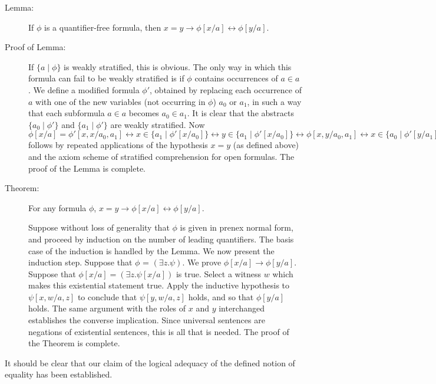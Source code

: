 \documentclass{article}
\begin{document}
\begin{description}

\item[Lemma:]  If $\phi$ is a quantifier-free formula, then 
$x = y \rightarrow \phi[x/a] \leftrightarrow \phi[y/a]$.

\item[Proof of Lemma:]  
If $\{a \mid \phi\}$ is weakly stratified, this is obvious.  The only
way in which this formula can fail to be weakly stratified is if
$\phi$ contains occurrences of $a \in a$.  We define a modified
formula $\phi'$, obtained by replacing each occurrence of $a$ with one
of the new variables (not occurring in $\phi$) $a_0$ or $a_1$, in such
a way that each subformula $a \in a$ becomes $a_0 \in a_1$.  It is
clear that the abstracts $\{a_0 \mid \phi'\}$ and $\{a_1 \mid \phi'\}$
are weakly stratified.  Now $\phi[x/a] = \phi'[x,x/a_0,a_1]
\leftrightarrow x \in \{a_1 \mid \phi'[x/a_0]\} \leftrightarrow y \in \{a_1 \mid \phi'[x/a_0]\} \leftrightarrow \phi[x,y/a_0,a_1] \leftrightarrow x \in \{a_0 \mid \phi'[y/a_1]\} \leftrightarrow y \in \{a_0 \mid \phi'[y/a_1]\} \leftrightarrow \phi'[y,y/a_0,a_1] = \phi[y/a]$ follows by repeated applications of the hypothesis $x = y$ (as defined above) and the axiom scheme of stratified comprehension for open formulas.  The proof of the Lemma is complete.

\item[Theorem:]  For any formula $\phi$, $x = y \rightarrow \phi[x/a] \leftrightarrow \phi[y/a]$.

Suppose without loss of generality that $\phi$ is given in prenex
normal form, and proceed by induction on the number of leading
quantifiers.  The basis case of the induction is handled by the Lemma.
We now present the induction step.  Suppose that $\phi$ = $(\exists
z.\psi)$.  We prove $\phi[x/a] \rightarrow \phi[y/a]$.  Suppose that
$\phi[x/a] = (\exists z.\psi[x/a])$ is true.  Select a witness $w$
which makes this existential statement true.  Apply the inductive
hypothesis to $\psi[x,w/a,z]$ to conclude that $\psi[y,w/a,z]$ holds,
and so that $\phi[y/a]$ holds.  The same argument with the roles of
$x$ and $y$ interchanged establishes the converse implication.  Since
universal sentences are negations of existential sentences, this is
all that is needed.  The proof of the Theorem is complete.

\end{description}

It should be clear that our claim of the logical adequacy of the
defined notion of equality has been established.
\end{document}
